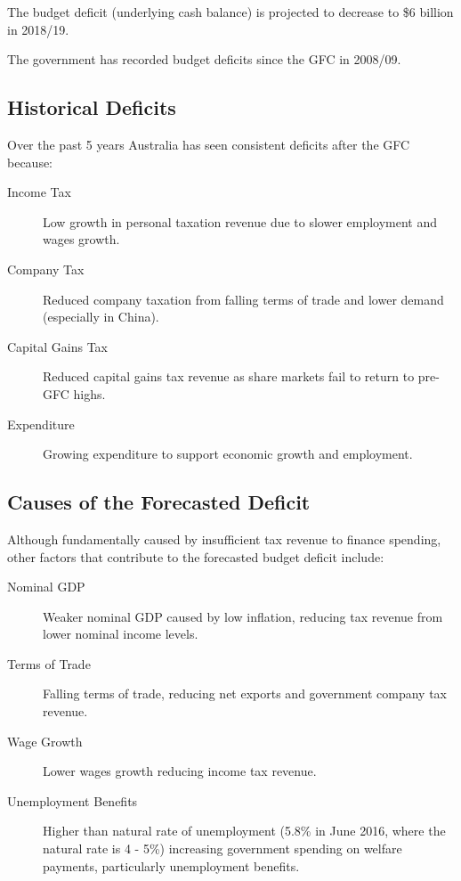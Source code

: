 \documentclass[a4paper,11pt]{article}
\begin{document}
The budget deficit (underlying cash balance) is projected to decrease to \$6
billion in 2018/19.

The government has recorded budget deficits since the GFC in 2008/09.


\subsection{Historical Deficits}

Over the past 5 years Australia has seen consistent deficits after the GFC
because:

\begin{description}
\item [Income Tax] Low growth in personal taxation revenue due to slower
	employment and wages growth.
\item [Company Tax] Reduced company taxation from falling terms of trade and
	lower demand (especially in China).
\item [Capital Gains Tax] Reduced capital gains tax revenue as share markets
	fail to return to pre-GFC highs.
\item [Expenditure] Growing expenditure to support economic growth and employment.
\end{description}


\subsection{Causes of the Forecasted Deficit}

Although fundamentally caused by insufficient tax revenue to finance spending,
other factors that contribute to the forecasted budget deficit include:

\begin{description}
\item [Nominal GDP] Weaker nominal GDP caused by low inflation, reducing tax
	revenue from lower nominal income levels.
\item [Terms of Trade] Falling terms of trade, reducing net exports and
	government company tax revenue.
\item [Wage Growth] Lower wages growth reducing income tax revenue.
\item [Unemployment Benefits] Higher than natural rate of unemployment (5.8\%
	in June 2016, where the natural rate is 4 - 5\%) increasing government
	spending on welfare payments, particularly unemployment benefits.
\end{description}
\end{document}
